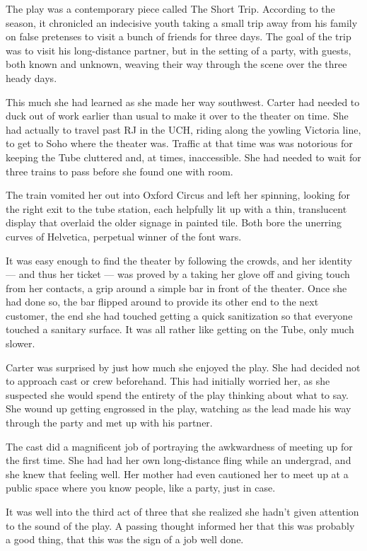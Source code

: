 The play was a contemporary piece called The Short Trip. According to the season, it chronicled an indecisive youth taking a small trip away from his family on false pretenses to visit a bunch of friends for three days. The goal of the trip was to visit his long-distance partner, but in the setting of a party, with guests, both known and unknown, weaving their way through the scene over the three heady days.

This much she had learned as she made her way southwest. Carter had needed to duck out of work earlier than usual to make it over to the theater on time. She had actually to travel past RJ in the UCH, riding along the yowling Victoria line, to get to Soho where the theater was. Traffic at that time was was notorious for keeping the Tube cluttered and, at times, inaccessible. She had needed to wait for three trains to pass before she found one with room.

The train vomited her out into Oxford Circus and left her spinning, looking for the right exit to the tube station, each helpfully lit up with a thin, translucent display that overlaid the older signage in painted tile. Both bore the unerring curves of Helvetica, perpetual winner of the font wars.

It was easy enough to find the theater by following the crowds, and her identity --- and thus her ticket --- was proved by a taking her glove off and giving touch from her contacts, a grip around a simple bar in front of the theater. Once she had done so, the bar flipped around to provide its other end to the next customer, the end she had touched getting a quick sanitization so that everyone touched a sanitary surface. It was all rather like getting on the Tube, only much slower.

Carter was surprised by just how much she enjoyed the play. She had decided not to approach cast or crew beforehand. This had initially worried her, as she suspected she would spend the entirety of the play thinking about what to say. She wound up getting engrossed in the play, watching as the lead made his way through the party and met up with his partner.

The cast did a magnificent job of portraying the awkwardness of meeting up for the first time. She had had her own long-distance fling while an undergrad, and she knew that feeling well. Her mother had even cautioned her to meet up at a public space where you know people, like a party, just in case.

It was well into the third act of three that she realized she hadn't given attention to the sound of the play. A passing thought informed her that this was probably a good thing, that this was the sign of a job well done.

